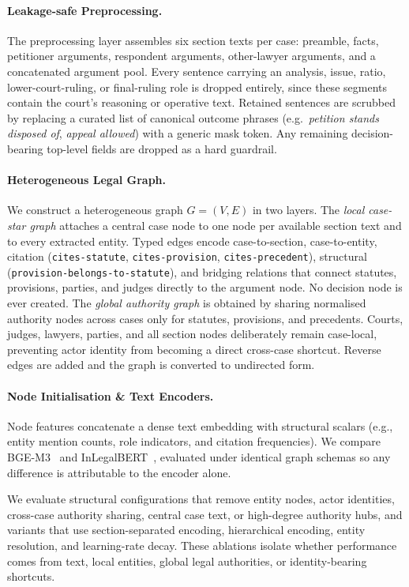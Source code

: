 \documentclass[runningheads]{llncs}
\begin{document}
\paragraph{Leakage-safe Preprocessing.}
The preprocessing layer assembles six section texts per case: preamble, facts, petitioner arguments, respondent arguments, other-lawyer arguments, and a concatenated argument pool. Every sentence carrying an analysis, issue, ratio, lower-court-ruling, or final-ruling role is dropped entirely, since these segments contain the court's reasoning or operative text. Retained sentences are scrubbed by replacing a curated list of canonical outcome phrases (e.g.\ \emph{petition stands disposed of}, \emph{appeal allowed}) with a generic mask token. Any remaining decision-bearing top-level fields are dropped as a hard guardrail. 

\paragraph{Heterogeneous Legal Graph.}
We construct a heterogeneous graph $G=(V,E)$ in two layers. The \emph{local case-star graph} attaches a central case node to one node per available section text and to every extracted entity. Typed edges encode case-to-section, case-to-entity, citation (\texttt{cites-statute}, \texttt{cites-provision}, \texttt{cites-precedent}), structural (\texttt{provision-belongs-to-statute}), and bridging relations that connect statutes, provisions, parties, and judges directly to the argument node. No decision node is ever created. The \emph{global authority graph} is obtained by sharing normalised authority nodes across cases only for statutes, provisions, and precedents. Courts, judges, lawyers, parties, and all section nodes deliberately remain case-local, preventing actor identity from becoming a direct cross-case shortcut. Reverse edges are added and the graph is converted to undirected form.

\paragraph{Node Initialisation \& Text Encoders.}
Node features concatenate a dense text embedding with structural scalars (e.g., entity mention counts, role indicators, and citation frequencies). We compare BGE-M3~\cite{chen2024bgem3} and InLegalBERT~\cite{paul2023inlegalbert}, evaluated under identical graph schemas so any difference is attributable to the encoder alone.

We evaluate structural configurations that remove entity nodes, actor identities, cross-case authority sharing, central case text, or high-degree authority hubs, and variants that use section-separated encoding, hierarchical encoding, entity resolution, and learning-rate decay. These ablations isolate whether performance comes from text, local entities, global legal authorities, or identity-bearing shortcuts.
\end{document}
